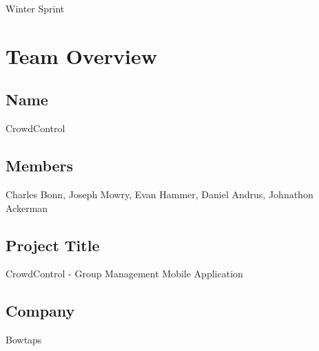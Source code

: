 \documentclass[11pt]{article}
\begin{document}
{\fontsize{16}{16}\selectfont Winter Sprint}

\section*{Team Overview}

\subsection*{Name}
CrowdControl
\subsection*{Members}
Charles Bonn, Joseph Mowry, Evan Hammer, Daniel Andrus, Johnathon Ackerman
\subsection*{Project Title}
CrowdControl - Group Management Mobile Application
\subsection*{Company}
Bowtaps
\end{document}
